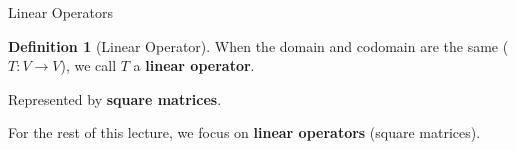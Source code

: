 \documentclass[10pt]{beamer}
\theoremstyle{definition}
\newtheorem{defi}{Definition}[section]
\newcommand{\x}[1]{\alert{\textbf{#1}}}
\begin{document}
\begin{frame}{Linear Operators}

\begin{defi}[Linear Operator]
When the domain and codomain are the same ($T: V \to V$), we call $T$ a \x{linear operator}.

Represented by \x{square matrices}.
\end{defi}

\vspace{1em}

For the rest of this lecture, we focus on \x{linear operators} (square matrices).

\end{frame}

%
\end{document}
